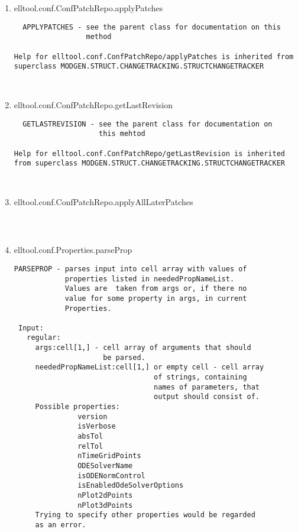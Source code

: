 \begin{enumerate}
\begin{lstlisting}
\end{lstlisting}
\fontfamily{\familydefault}
\selectfont
\item {elltool.conf.ConfPatchRepo.applyPatches}
\selectfont
\begin{lstlisting}
  APPLYPATCHES - see the parent class for documentation on this
                 method

Help for elltool.conf.ConfPatchRepo/applyPatches is inherited from superclass MODGEN.STRUCT.CHANGETRACKING.STRUCTCHANGETRACKER



\end{lstlisting}
\fontfamily{\familydefault}
\selectfont
\item {elltool.conf.ConfPatchRepo.getLastRevision}
\selectfont
\begin{lstlisting}
  GETLASTREVISION - see the parent class for documentation on
                    this mehtod

Help for elltool.conf.ConfPatchRepo/getLastRevision is inherited from superclass MODGEN.STRUCT.CHANGETRACKING.STRUCTCHANGETRACKER



\end{lstlisting}
\fontfamily{\familydefault}
\selectfont
\item {elltool.conf.ConfPatchRepo.applyAllLaterPatches}
\selectfont
\begin{lstlisting}



\end{lstlisting}
\fontfamily{\familydefault}
\selectfont
\item {elltool.conf.Properties.parseProp}
\selectfont
\begin{lstlisting}
PARSEPROP - parses input into cell array with values of
            properties listed in neededPropNameList.
            Values are  taken from args or, if there no
            value for some property in args, in current
            Properties.

 Input:
   regular:
     args:cell[1,] - cell array of arguments that should
                     be parsed.
     neededPropNameList:cell[1,] or empty cell - cell array
                                 of strings, containing
                                 names of parameters, that
                                 output should consist of.
     Possible properties:
               version
               isVerbose
               absTol
               relTol
               nTimeGridPoints
               ODESolverName
               isODENormControl
               isEnabledOdeSolverOptions
               nPlot2dPoints
               nPlot3dPoints
     Trying to specify other properties would be regarded
     as an error.


\end{lstlisting}
\end{enumerate}
